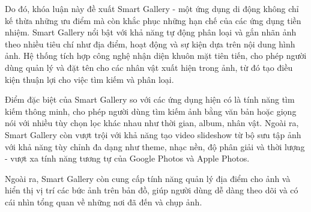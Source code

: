 Do đó, khóa luận này đề xuất Smart Gallery - một ứng dụng di động không chỉ kế thừa những ưu điểm mà còn khắc phục những hạn chế của các ứng dụng tiền nhiệm. Smart Gallery nổi bật với khả năng tự động phân loại và gắn nhãn ảnh theo nhiều tiêu chí như địa điểm, hoạt động và sự kiện dựa trên nội dung hình ảnh. Hệ thống tích hợp công nghệ nhận diện khuôn mặt tiên tiến, cho phép người dùng quản lý và đặt tên cho các nhân vật xuất hiện trong ảnh, từ đó tạo điều kiện thuận lợi cho việc tìm kiếm và phân loại.

Điểm đặc biệt của Smart Gallery so với các ứng dụng hiện có là tính năng tìm kiếm thông minh, cho phép người dùng tìm kiếm ảnh bằng văn bản hoặc giọng nói với nhiều tùy chọn lọc khác nhau như thời gian, album, nhân vật. Ngoài ra, Smart Gallery còn vượt trội với khả năng tạo video slideshow từ bộ sưu tập ảnh với khả năng tùy chỉnh đa dạng như theme, nhạc nền, độ phân giải và thời lượng - vượt xa tính năng tương tự của Google Photos và Apple Photos.

Ngoài ra, Smart Gallery còn cung cấp tính năng quản lý địa điểm cho ảnh và hiển thị vị trí các bức ảnh trên bản đồ, giúp người dùng dễ dàng theo dõi và có cái nhìn tổng quan về những nơi đã đến và chụp ảnh.